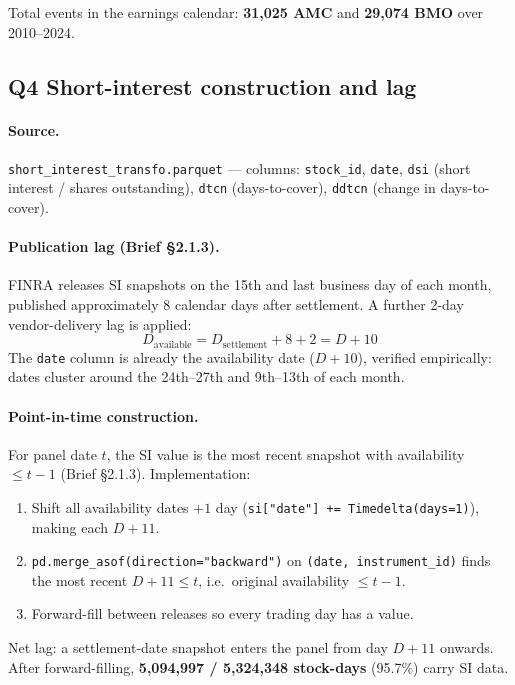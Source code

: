 \documentclass[12pt,a4paper]{article}
\begin{document}
Total events in the earnings calendar: \textbf{31,025 AMC} and
\textbf{29,074 BMO} over 2010--2024.

\subsection*{Q4 \quad Short-interest construction and lag}
\label{sec:q4}

\paragraph{Source.}
\texttt{short\_interest\_transfo.parquet} --- columns: \texttt{stock\_id},
\texttt{date}, \texttt{dsi} (short interest / shares outstanding),
\texttt{dtcn} (days-to-cover), \texttt{ddtcn} (change in days-to-cover).

\paragraph{Publication lag (Brief §2.1.3).}
FINRA releases SI snapshots on the 15th and last business day of each month,
published approximately 8 calendar days after settlement.  A further 2-day
vendor-delivery lag is applied:
\[
D_{\text{available}} = D_{\text{settlement}} + 8 + 2 = D + 10
\]
The \texttt{date} column is already the availability date ($D+10$), verified
empirically: dates cluster around the 24th--27th and 9th--13th of each month.

\paragraph{Point-in-time construction.}
For panel date $t$, the SI value is the most recent snapshot with availability
$\leq t-1$ (Brief §2.1.3).  Implementation:
\begin{enumerate}[leftmargin=1.5em]
  \item Shift all availability dates $+1$ day (\texttt{si["date"] += Timedelta(days=1)}),
        making each $D+11$.
  \item \texttt{pd.merge\_asof(direction="backward")} on \texttt{(date, instrument\_id)}
        finds the most recent $D+11 \leq t$, i.e.\ original availability $\leq t-1$. \checkmark
  \item Forward-fill between releases so every trading day has a value.
\end{enumerate}
Net lag: a settlement-date snapshot enters the panel from day $D+11$ onwards.
After forward-filling, \textbf{5,094,997 / 5,324,348 stock-days} (95.7\%) carry SI data.
\end{document}

